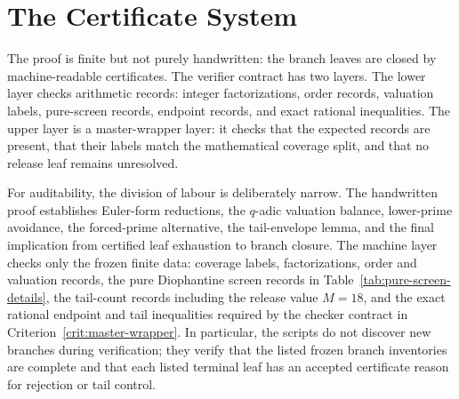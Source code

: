 \documentclass[11pt]{article}
\theoremstyle{definition}
\theoremstyle{remark}
\begin{document}
\section{The Certificate System}
\label{sec:certificates}

The proof is finite but not purely handwritten: the branch leaves are closed by
machine-readable certificates.  The verifier contract has two layers.  The
lower layer checks arithmetic records: integer factorizations, order records,
valuation labels, pure-screen records, endpoint records, and exact rational
inequalities.  The upper layer is a master-wrapper layer: it checks that the
expected records are present, that their labels match the mathematical coverage
split, and that no release leaf remains unresolved.

For auditability, the division of labour is deliberately narrow.  The
handwritten proof establishes Euler-form reductions, the \(q\)-adic valuation
balance, lower-prime avoidance, the forced-prime alternative, the tail-envelope
lemma, and the final implication from certified leaf exhaustion to branch
closure.  The machine layer checks only the frozen finite data: coverage labels,
factorizations, order and valuation records, the pure Diophantine screen
records in Table~\ref{tab:pure-screen-details}, the tail-count records
including the release value \(M=18\), and the exact rational endpoint and tail
inequalities required by the checker contract in Criterion~\ref{crit:master-wrapper}.
In particular, the scripts do not discover new branches during verification;
they verify that the listed frozen branch inventories are complete and that
each listed terminal leaf has an accepted certificate reason for rejection or
tail control.
\end{document}
